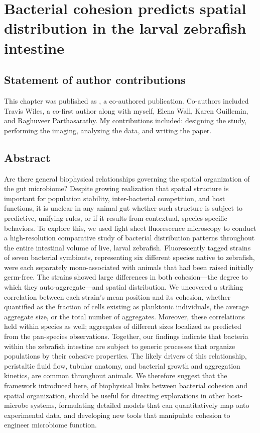 



\chapter{Bacterial cohesion predicts spatial distribution in the larval zebrafish intestine}


\section{Statement of author contributions}
This chapter was published as \cite{schlomann_bacterial_2018}, a co-authored publication. Co-authors included Travis Wiles, a co-first author along with myself, Elena Wall, Karen Guillemin, and Raghuveer Parthasarathy. My contributions included: designing the study, performing the imaging, analyzing the data, and writing the paper. 



\section{Abstract}
Are there general biophysical relationships governing the spatial organization of the gut microbiome? Despite growing realization that spatial structure is important for population stability, inter-bacterial competition, and host functions, it is unclear in any animal gut whether such structure is subject to predictive, unifying rules, or if it results from contextual, species-specific behaviors. To explore this, we used light sheet fluorescence microscopy to conduct a high-resolution comparative study of bacterial distribution patterns throughout the entire intestinal volume of live, larval zebrafish. Fluorescently tagged strains of seven bacterial symbionts, representing six different species native to zebrafish, were each separately mono-associated with animals that had been raised initially germ-free. The strains showed large differences in both cohesion---the degree to which they auto-aggregate---and spatial distribution. We uncovered a striking correlation between each strain's mean position and its cohesion, whether quantified as the fraction of cells existing as planktonic individuals, the average aggregate size, or the total number of aggregates. Moreover, these correlations held within species as well; aggregates of different sizes localized as predicted from the pan-species observations. Together, our findings indicate that bacteria within the zebrafish intestine are subject to generic processes that organize populations by their cohesive properties. The likely drivers of this relationship, peristaltic fluid flow, tubular anatomy, and bacterial growth and aggregation kinetics, are common throughout animals. We therefore suggest that the framework introduced here, of biophysical links between bacterial cohesion and spatial organization, should be useful for directing explorations in other host-microbe systems, formulating detailed models that can quantitatively map onto experimental data, and developing new tools that manipulate cohesion to engineer microbiome function.

